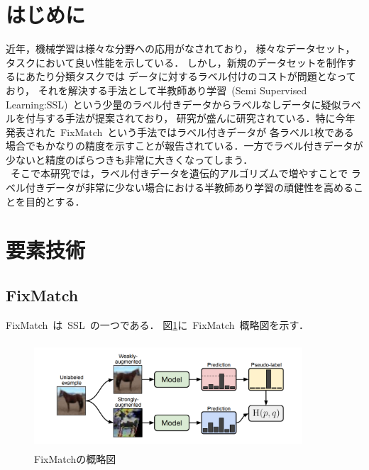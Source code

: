 \documentclass[twocolumn]{jarticle}     %
\begin{document}

\section{はじめに}
近年，機械学習は様々な分野への応用がなされており，
様々なデータセット，タスクにおいて良い性能を示している．
しかし，新規のデータセットを制作するにあたり分類タスクでは
データに対するラベル付けのコストが問題となっており，
それを解決する手法として半教師あり学習\ (Semi Supervised Learning:SSL)\ という少量のラベル付きデータからラベルなしデータに疑似ラベルを付与する手法が提案されており，
研究が盛んに研究されている．特に今年発表された\ FixMatch\cite{sohn2020fixmatch}\ という手法ではラベル付きデータが
各ラベル1枚である場合でもかなりの精度を示すことが報告されている．一方でラベル付きデータが少ないと精度のばらつきも非常に大きくなってしまう．\\
\  そこで本研究では，ラベル付きデータを遺伝的アルゴリズムで増やすことで
ラベル付きデータが非常に少ない場合における半教師あり学習の頑健性を高めることを目的とする．

\section{要素技術}
\subsection{FixMatch}
FixMatch\cite{sohn2020fixmatch}\ は\ SSL\ の一つである．
図\ref{fig:daigram1}に\ FixMatch\ 概略図を示す．
\begin{figure}[h]
	\begin{center}
		\vspace*{-3mm}
		\hspace*{-8mm}
		\includegraphics[height=40mm,width=100mm]{1.PNG}
		\caption{FixMatch\cite{sohn2020fixmatch}の概略図\label{fig:daigram1}}
	\end{center}
\end{figure}
\end{document}
